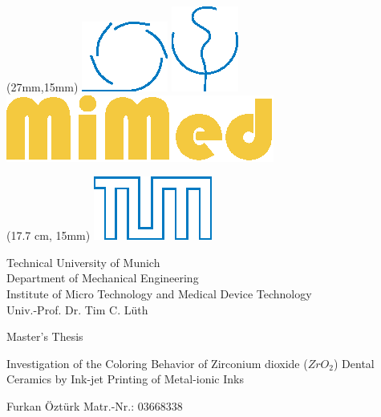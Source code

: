 \thispagestyle{plain}


\begin{textblock*}{9 cm}(27mm,15mm)
\includegraphics[valign=t]{grafiken/MW_CMYK.eps}
\hspace{5 mm}
\includegraphics[valign=t]{grafiken/MED_CMYK.eps}
\hspace{5 mm}
\includegraphics[valign=t]{grafiken/MiMed.eps}
\end{textblock*}

\begin{textblock*}{2 cm}(17.7 cm, 15mm)
\includegraphics[]{grafiken/TUMLogo_oZ_Outline_blau_CMYK.eps}
\end{textblock*}

\hspace{5 mm}

\begin{center}
\begin{singlespace}
\small Technical University of Munich\smallskip\\
Department of Mechanical Engineering\smallskip\\
Institute of Micro Technology and Medical Device Technology\smallskip\\
Univ.-Prof. Dr. Tim C. Lüth
\end{singlespace}
\end{center}
\vspace{0.8 cm}
\begin{center}
{\large Master's Thesis}
\end{center}
\vspace{0.70 cm}
\begin{center}
{\Large Investigation of the Coloring Behavior of Zirconium dioxide ($ZrO_2$) Dental Ceramics by Ink-jet Printing of Metal-ionic Inks}
\end{center}
\vspace{0.70 cm}
\begin{center}
{\large Furkan Öztürk\nl
Matr.-Nr.: 03668338}
\end{center}

